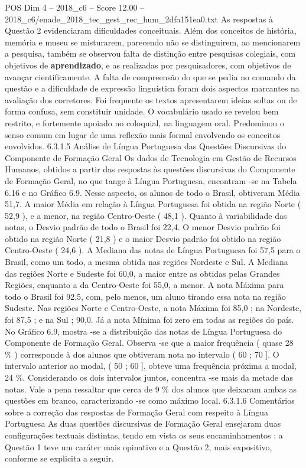 \begin{textsample}{POS Dim 4 – 2018\_c6 – Score 12.00 – 2018\_c6/enade\_2018\_tec\_gest\_rec\_hum\_2dfa151ea0.txt}
As respostas à Questão 2 evidenciaram dificuldades conceituais.
Além dos conceitos de história, memória e museu se misturarem, parecendo não se distinguirem, ao mencionarem a pesquisa, também se observou falta de distinção entre pesquisas colegiais, com objetivos de \textbf{aprendizado}, e as realizadas por pesquisadores, com objetivos de avançar cientificamente.
A falta de compreensão do que se pedia no comando da questão e a dificuldade de expressão linguística foram dois aspectos marcantes na avaliação dos corretores.
Foi frequente os textos apresentarem ideias soltas ou de forma confusa, sem constituir unidade.
O vocabulário usado se revelou bem restrito, e fortemente apoiado no coloquial, na linguagem oral.
Predominou o senso comum em lugar de uma reflexão mais formal envolvendo os conceitos envolvidos. 6.3.1.5 Análise de Língua Portuguesa das Questões Discursivas do Componente de Formação Geral Os dados de Tecnologia em Gestão de Recursos Humanos, obtidos a partir das respostas às questões discursivas do Componente de Formação Geral, no que tange à Língua Portuguesa, encontram -se na Tabela 6.16 e no Gráfico 6.9.
Nesse aspecto, os alunos de todo o Brasil, obtiveram Média 51,7.
A maior Média em relação à Língua Portuguesa foi obtida na região Norte ( 52,9 ), e a menor, na região Centro-Oeste ( 48,1 ).
Quanto à variabilidade das notas, o Desvio padrão de todo o Brasil foi 22,4.
O menor Desvio padrão foi obtido na região Norte ( 21,8 ) e o maior Desvio padrão foi obtido na região Centro-Oeste ( 24,6 ).
A Mediana das notas de Língua Portuguesa foi 57,5 para o Brasil, como um todo, a mesma obtida nas regiões Nordeste e Sul.
A Mediana das regiões Norte e Sudeste foi 60,0, a maior entre as obtidas pelas Grandes Regiões, enquanto a da Centro-Oeste foi 55,0, a menor.
A nota Máxima para todo o Brasil foi 92,5, com, pelo menos, um aluno tirando essa nota na região Sudeste.
Nas regiões Norte e Centro-Oeste, a nota Máxima foi 85,0 ; na Nordeste, foi 87,5 ; e na Sul ; 90,0.
Já a nota Mínima foi zero em todas as regiões do país.
No Gráfico 6.9, mostra -se a distribuição das notas de Língua Portuguesa do Componente de Formação Geral.
Observa -se que a maior frequência ( quase 28 \% ) corresponde à dos alunos que obtiveram nota no intervalo ( 60 ; 70 ].
O intervalo anterior ao modal, ( 50 ; 60 ], obteve uma frequência próxima a modal, 24 \%.
Considerando os dois intervalos juntos, concentra -se mais da metade das notas.
Vale a pena ressaltar que cerca de 9 \% dos alunos que deixaram ambas as questões em branco, caracterizando -se como máximo local. 6.3.1.6 Comentários sobre a correção das respostas de Formação Geral com respeito à Língua Portuguesa As duas questões discursivas de Formação Geral ensejaram duas configurações textuais distintas, tendo em vista os seus encaminhamentos : a Questão 1 teve um caráter mais opinativo e a Questão 2, mais expositivo, conforme se explicita a seguir.

\end{textsample}
